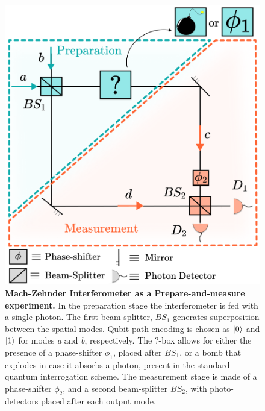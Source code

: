 \documentclass[letterpaper,onecolumn,12pt,accepted=2024-01-17]{article}
\begin{document}
\begin{figure}[tb]
    \centering
    \includegraphics[width=\columnwidth]{Acc_Figures/MZI_as_PM.png}
    \caption{\textbf{Mach-Zehnder Interferometer as a Prepare-and-measure experiment.} In the preparation stage the interferometer is fed with a single photon. The first beam-splitter, $BS_1$ generates superposition between the spatial modes. Qubit path encoding is chosen as $\ket{0}$ and $\ket{1}$ for modes \textit{a} and \textit{b}, respectively. The $?$-box allows for either the presence of a phase-shifter $\phi_1$, placed after $BS_1$, or a bomb that explodes in case it absorbs a photon, present in the standard quantum interrogation scheme. The measurement stage is made of a phase-shifter $\phi_2$, and a second beam-splitter $BS_2$, with photo-detectors placed after each output mode.}
    \label{fig:MZI}
\end{figure}
\end{document}
